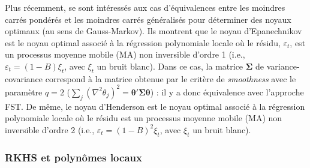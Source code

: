 \documentclass[
  12pt,
  a4paper,french]{article}
\newcommand\1{\mathds{1}}
\begin{document}
Plus récemment, \textcite{LuatiProietti2011} se sont intéressés aux cas d'équivalences entre les moindres carrés pondérés et les moindres carrés généralisés pour déterminer des noyaux optimaux (au sens de Gauss-Markov).
Ils montrent que le noyau d'Epanechnikov est le noyau optimal associé à la régression polynomiale locale où le résidu, \(\varepsilon_t\), est un processus moyenne mobile (MA) non inversible d'ordre 1 (i.e., \(\varepsilon_t=(1-B)\xi_t\), avec \(\xi_t\) un bruit blanc).
Dans ce cas, la matrice \(\boldsymbol \Sigma\) de variance-covariance correspond à la matrice obtenue par le critère de \emph{smoothness} avec le paramètre \(q=2\) (\(\sum_{j}(\nabla^{2}\theta_{j})^{2} = \boldsymbol \theta'\boldsymbol \Sigma\boldsymbol \theta\)) : il y a donc équivalence avec l'approche FST.
De même, le noyau d'Henderson est le noyau optimal associé à la régression polynomiale locale où le résidu est un processus moyenne mobile (MA) non inversible d'ordre 2 (i.e., \(\varepsilon_t=(1-B)^2\xi_t\), avec \(\xi_t\) un bruit blanc).

\hypertarget{rkhs-et-polynuxf4mes-locaux}{%
\subsubsection{RKHS et polynômes locaux}\label{rkhs-et-polynuxf4mes-locaux}}
\end{document}
